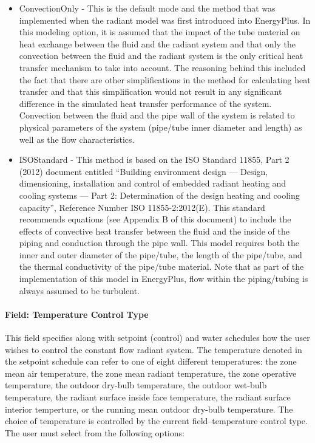 \begin{itemize}
\item
  ConvectionOnly - This is the default mode and the method that was implemented when the radiant model was first introduced into EnergyPlus.  In this modeling option, it is assumed that the impact of the tube material on heat exchange between the fluid and the radiant system and that only the convection between the fluid and the radiant system is the only critical heat transfer mechanism to take into account.  The reasoning behind this included the fact that there are other simplifications in the method for calculating heat transfer and that this simplification would not result in any significant difference in the simulated heat transfer performance of the system.  Convection between the fluid and the pipe wall of the system is related to physical parameters of the system (pipe/tube inner diameter and length) as well as the flow characteristics.
\item
ISOStandard - This method is based on the ISO Standard 11855, Part 2 (2012) document entitled ``Building environment design — Design, dimensioning, installation and control of embedded radiant heating and cooling systems — Part 2: Determination of the design heating and cooling capacity'', Reference Number ISO 11855-2:2012(E).  This standard recommends equations (see Appendix B of this document) to include the effects of convective heat transfer between the fluid and the inside of the piping and conduction through the pipe wall.  This model requires both the inner and outer diameter of the pipe/tube, the length of the pipe/tube, and the thermal conductivity of the pipe/tube material.  Note that as part of the implementation of this model in EnergyPlus, flow within the piping/tubing is always assumed to be turbulent.
\end{itemize}

\paragraph{Field: Temperature Control Type}\label{field-temperature-control-type-1}

This field specifies along with setpoint (control) and water schedules how the user wishes to control the constant flow radiant system. The temperature denoted in the setpoint schedule can refer to one of eight different temperatures: the zone mean air temperature, the zone mean radiant temperature, the zone operative temperature, the outdoor dry-bulb temperature, the outdoor wet-bulb temperature, the radiant surface inside face temperature, the radiant surface interior temperture, or the running mean outdoor dry-bulb temperature. The choice of temperature is controlled by the current field--temperature control type. The user must select from the following options:

